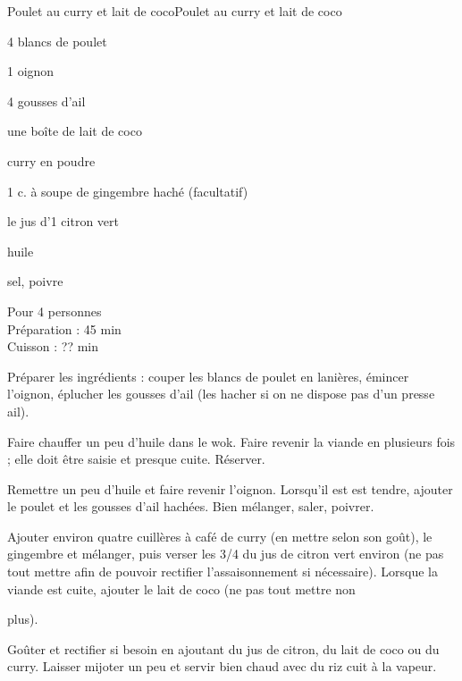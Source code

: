 \begin{recette}{Poulet au curry et lait de coco}{Poulet au curry et lait de coco}

\begin{ingredients}
4 blancs de poulet \par
1 oignon \par
4 gousses d'ail\par
une boîte de lait de coco\par
curry en poudre\par
1 c. à soupe de gingembre haché (facultatif)\par
le jus d'1 citron vert\par
huile\par
sel, poivre\par
\end{ingredients}

\begin{infos}
Pour 4 personnes\\
Préparation : 45 min\\
Cuisson : ?? min\\
\end{infos}

\begin{etapes}
\item Préparer les ingrédients : couper les blancs de poulet en lanières, émincer l'oignon, éplucher les gousses d'ail (les hacher si on ne dispose pas d'un presse ail).
\item Faire chauffer un peu d'huile dans le wok. Faire revenir la viande en plusieurs fois ; elle doit être saisie et presque cuite. Réserver.
\item Remettre un peu d'huile et faire revenir l'oignon. Lorsqu'il est est tendre, ajouter le poulet et les gousses d'ail hachées. Bien mélanger, saler, poivrer.
\item Ajouter environ quatre cuillères à café de curry (en mettre selon son goût), le gingembre et mélanger, puis verser les 3/4 du jus de citron vert environ (ne pas tout mettre afin de pouvoir rectifier l'assaisonnement si nécessaire). Lorsque la viande est cuite, ajouter le lait de coco (ne pas tout mettre non
\item plus).
\item Goûter et rectifier si besoin en ajoutant du jus de citron, du lait de coco ou du curry. Laisser mijoter un peu et servir bien chaud avec du riz cuit à la vapeur.
\end{etapes}

\end{recette}